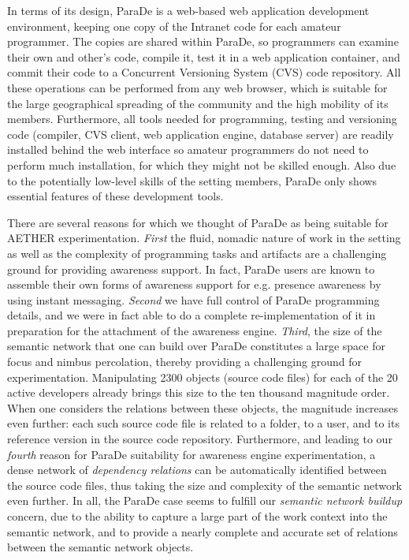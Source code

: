 \documentclass{ecscw2007}
\begin{document}
In terms of its design, ParaDe is a web-based web application development environment, keeping one copy of the Intranet code for each amateur programmer. The copies are shared within ParaDe, so programmers can examine their own and other's code, compile it, test it in a web application container, and commit their code to a Concurrent Versioning System (CVS) code repository. All these operations can be performed from any web browser, which is suitable for the large geographical spreading of the community and the high mobility of its members. Furthermore, all tools needed for programming, testing and versioning code (compiler, CVS client, web application engine, database server) are readily installed behind the web interface so amateur programmers do not need to perform much installation, for which they might not be skilled enough. Also due to the potentially low-level skills of the setting members, ParaDe only shows essential features of these development tools.

There are several reasons for which we thought of ParaDe as being suitable for AETHER experimentation. \textit{First} the fluid, nomadic nature of work in the setting as well as the complexity of programming tasks and artifacts are a challenging ground for providing awareness support. In fact, ParaDe users are known to assemble their own forms of awareness support for e.g. presence awareness by using instant messaging. \textit{Second} we have full control of ParaDe programming details, and we were in fact able to do a complete re-implementation of it in preparation for the attachment of the awareness engine. \textit{Third}, the size of the semantic network that one can build over ParaDe constitutes a large space for focus and nimbus percolation, thereby providing a challenging ground for experimentation. Manipulating 2300 objects (source code files) for each of the 20 active developers already brings this size to the ten thousand magnitude order. When one considers the relations between these objects, the magnitude increases even further: each such source code file is related to a folder, to a user, and to its reference version in the source code repository. Furthermore, and leading to our \textit{fourth} reason for ParaDe suitability for awareness engine experimentation, a dense network of \textit{dependency relations} can be automatically identified between the source code files, thus taking the size and complexity of the semantic network even further. In all, the ParaDe case seems to fulfill our \textit{semantic network buildup} concern, due to the ability to capture a large part of the work context into the semantic network, and to provide a nearly complete and accurate set of relations between the semantic network objects. 
\end{document}
